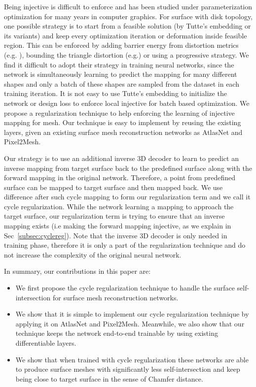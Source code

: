Being injective is difficult to enforce and has been studied under parameterization optimization for many years in computer graphics. For surface with disk topology, one possible strategy is to start from a feasible solution (by Tutte's embedding\cite{tutte} or its variants) and keep every optimization iteration or deformation inside feasible region. This can be enforced by adding barrier energy from distortion metrics (e.g. \cite{provableplanarmapping,lifted_bijection}), bounding the triangle distortion (e.g.\cite{freeboundary,boundeddistortion})
or using a progressive strategy\cite{Liu_PP_2018}.
We find it difficult to adopt their strategy in training neural networks, since the network is simultaneously learning to predict the mapping for many different shapes and only a batch of these shapes are sampled from the dataset in each training iteration. It is not easy to use Tutte's embedding to initialize the network or design loss to enforce local injective for batch based optimization. We propose a regularization technique to help enforcing the learning of injective mapping for mesh. Our technique is easy to implement by reusing the existing layers, given an existing surface mesh reconstruction networks as AtlasNet\cite{atlasnet} and Pixel2Mesh\cite{pixel2mesh}.  

 Our strategy is to use an additional inverse 3D decoder to learn to predict an inverse mapping from target surface back to the predefined surface along with the forward mapping in the original network. Therefore, a point from predefined surface can be mapped to target surface and then mapped back. We use difference after such cycle mapping to form our regularization term and we call it cycle regularization. While the network learning a mapping to approach the target surface, our regularization term is trying to ensure that an inverse mapping exists (i.e making the forward mapping injective, as we explain in Sec~\ref{subsec:cyclereg}).
Note that the inverse 3D decoder is only needed in training phase, therefore it is only a part of the regularization technique and do not increase the complexity of the original neural network.

In summary, our contributions in this paper are:
\begin{itemize}
	\item We first propose the cycle regularization technique to handle the surface self-intersection for surface mesh reconstruction networks. 
	\item We show that it is simple to implement our cycle regularization technique by applying it on AtlasNet\cite{atlasnet} and Pixel2Mesh\cite{pixel2mesh}. Meanwhile, we also show that our technique keeps the network end-to-end trainable by using existing differentiable layers.
	\item We show that when trained with cycle regularization these networks are able to produce surface meshes with significantly less self-intersection and keep being close to target surface in the sense of Chamfer distance.
\end{itemize}




 